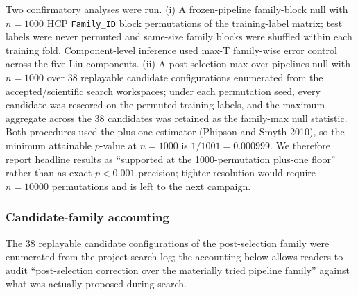 \documentclass[11pt,letterpaper]{report}
\begin{document}
Two confirmatory analyses were run. (i) A frozen-pipeline family-block null with $n = 1000$ HCP \texttt{Family\_ID} block permutations of the training-label matrix; test labels were never permuted and same-size family blocks were shuffled within each training fold. Component-level inference used max-T family-wise error control across the five Liu components. (ii) A post-selection max-over-pipelines null with $n = 1000$ over 38 replayable candidate configurations enumerated from the accepted/scientific search workspaces; under each permutation seed, every candidate was rescored on the permuted training labels, and the maximum aggregate across the 38 candidates was retained as the family-max null statistic. Both procedures used the plus-one estimator (Phipson and Smyth 2010), so the minimum attainable $p$-value at $n = 1000$ is $1/1001 = 0.000999$. We therefore report headline results as ``supported at the 1000-permutation plus-one floor'' rather than as exact $p < 0.001$ precision; tighter resolution would require $n = 10000$ permutations and is left to the next campaign.

\subsubsection*{Candidate-family accounting}

The 38 replayable candidate configurations of the post-selection family were enumerated from the project search log; the accounting below allows readers to audit ``post-selection correction over the materially tried pipeline family'' against what was actually proposed during search.
\end{document}
